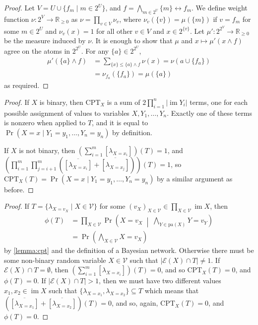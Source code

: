 \documentclass{article}
\DeclareMathOperator{\im}{im}
\begin{document}
\extendable*
\begin{proof}
  Let $V = U \cup \{ f_m \mid m \in 2^U \}$, and $f = \bigwedge_{m \in 2^U} \{ m
  \} \leftrightarrow f_m$. We define weight function $\nu\colon 2^V \to
  \mathbb{R}_{\ge 0}$ as $\nu = \prod_{v \in V} \nu_v$, where $\nu_v(\{v\}) =
  \mu(\{m\})$ if $v = f_m$ for some $m \in 2^U$ and $\nu_v(x) = 1$ for all other
  $v \in V$ and $x \in 2^{\{v\}}$. Let $\mu'\colon 2^{2^V} \to \mathbb{R}_{\ge
    0}$ be the measure induced by $\nu$. It is enough to show that $\mu$ and $x
  \mapsto \mu'(x \land f)$ agree on the atoms in $2^{2^U}$. For any $\{ a \} \in
  2^{2^U}$,
  \begin{align*}
    \mu'(\{ a \} \land f) &= \sum_{\{ x \} \le \{ a \} \land f} \nu(x) = \nu(a \cup \{ f_a \}) \\
                          &= \nu_{f_a}(\{ f_a \}) = \mu(\{ a \})
  \end{align*}
  as required.
\end{proof}

\cptlemma*
\begin{proof}
  If $X$ is binary, then $\mathrm{CPT}_X$ is a sum of $2\prod_{i=1}^n |\im
  Y_i|$ terms, one for each possible assignment of values to variables $X, Y_1,
  \dots, Y_n$. Exactly one of these terms is nonzero when applied to $T$, and
  it is equal to $\Pr(X = x \mid Y_1 = y_1, \dots, Y_n = y_n)$ by definition.

  If $X$ is not binary, then $\left( \sum_{i=1}^m [\lambda_{X = x_i}]
  \right)(T) = 1$, and $\left( \prod_{i=1}^m \prod_{j=i+1}^m
    (\overline{[\lambda_{X = x_i}]} + \overline{[\lambda_{X = x_j}]})
  \right)(T) = 1$, so $\mathrm{CPT}_X(T) = \Pr(X = x \mid Y_1 = y_1,
  \dots, Y_n = y_n)$ by a similar argument as before.
\end{proof}

\fulldistribution*
\begin{proof}
  If $T = \{ \lambda_{X=v_X} \mid X \in \mathcal{V} \}$ for some $(v_X)_{X
    \in \mathcal{V}} \in \prod_{X \in \mathcal{V}} \im X$, then
  \begin{align*}
    \phi(T) &= \prod_{X \in \mathcal{V}} \Pr \left( X=v_X \;\middle|\; \bigwedge_{Y \in \mathrm{pa}(X)} Y=v_Y \right) \\
            &= \Pr \left( \bigwedge_{X \in \mathcal{V}} X=v_X \right)
  \end{align*}
  by \cref{lemma:cpt} and the definition of a Bayesian network. Otherwise there
  must be some non-binary random variable $X \in \mathcal{V}$ such that
  $|\mathcal{E}(X) \cap T| \ne 1$. If $\mathcal{E}(X) \cap T = \emptyset$, then
  $\left( \sum_{i=1}^m [\lambda_{X = x_i}] \right)(T) = 0$, and so
  $\mathrm{CPT}_X(T) = 0$, and $\phi(T) = 0$. If $|\mathcal{E}(X) \cap T| > 1$,
  then we must have two different values $x_1, x_2 \in \im X$ such that
  $\{\lambda_{X=x_1}, \lambda_{X=x_2} \} \subseteq T$ which means that
  $(\overline{[\lambda_{X=x_1}]} + \overline{[\lambda_{X=x_2}]})(T) = 0$, and
  so, again, $\mathrm{CPT}_X(T) = 0$, and $\phi(T) = 0$.
\end{proof}
\end{document}

